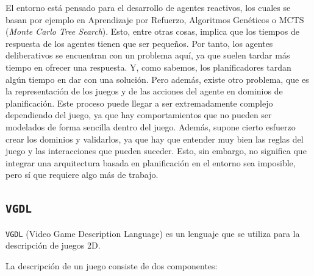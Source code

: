 El entorno está pensado para el desarrollo de agentes reactivos, los cuales se basan por ejemplo en
Aprendizaje por Refuerzo, Algoritmos Genéticos o MCTS (\textit{Monte Carlo Tree Search}). Esto, entre
otras cosas, implica que los tiempos de respuesta de los agentes tienen que ser pequeños. Por tanto,
los agentes deliberativos se encuentran con un problema aquí, ya que suelen tardar más tiempo en ofrecer
una respuesta. Y, como sabemos, los planificadores tardan algún tiempo en dar con una solución. Pero además,
existe otro problema, que es la representación de los juegos y de las acciones del agente en
dominios de planificación. Este proceso puede llegar a ser extremadamente complejo dependiendo
del juego, ya que hay comportamientos que no pueden ser modelados de forma sencilla dentro del juego.
Además, supone cierto esfuerzo crear los dominios y validarlos, ya que hay que entender muy bien las reglas
del juego y las interacciones que pueden suceder. Esto, sin embargo, no significa que integrar una arquitectura
basada en planificación en el entorno sea imposible, pero sí que requiere algo más de trabajo.

\subsection{\texttt{VGDL}}

\texttt{VGDL} (Video Game Description Language) \cite{Schaul2013AVG} es un lenguaje que se
utiliza para la descripción de juegos 2D.

La descripción de un juego consiste de dos componentes:

